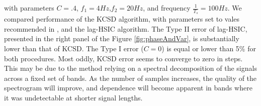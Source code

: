 with parameters $C=.4$, $f_1=4Hz$,$f_2=20Hz$, and frequency $\frac {1} {T_s} = 100 Hz$. We compared performance of the KCSD algorithm, with parameters set to vales recommended in \cite{besserve_statistical_2013}, and the lag-HSIC algorithm. The Type II error of lag-HSIC, presented in the right panel of the Figure \ref{fig:phaseAndVar}, is substantially lower than that of KCSD. The Type I error ($C=0$) is equal or lower than 5\% for both procedures. Most oddly, KCSD error seems to converge to zero in steps. This may be due to the method relying on a spectral decomposition of the signals across a fixed set of bands. As the number of samples increases, the quality of the spectrogram will improve, and dependence will become apparent in bands where it was undetectable at shorter signal lengths.
 
